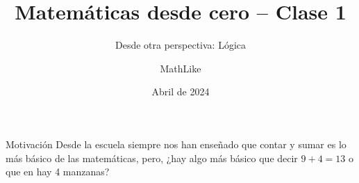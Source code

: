 \documentclass[dvisvgm,hypertex,aspectratio=169]{beamer}
\title{Matemáticas desde cero -- Clase 1}
\subtitle{Desde otra perspectiva: Lógica}
\author{MathLike}
\date{Abril de 2024}
\institute{Administrador de The Math Guys}
\begin{document}
\begin{frame}
  \titlepage
\end{frame}
\begin{frame}{Motivación}
  Desde la escuela siempre nos han enseñado que contar y sumar es lo más básico
  de las matemáticas, pero, ¿hay algo más básico que decir $9+4=13$
  o que en  hay 4 manzanas?
\end{frame}
\end{document}
